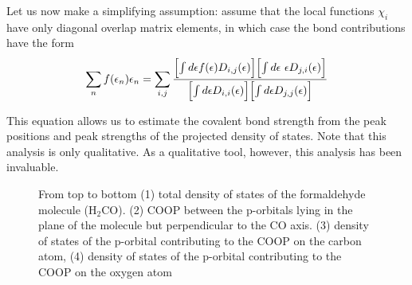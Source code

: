 \documentclass[final,12pt]{article}
\begin{document}
{Let us now make a simplifying assumption: assume that the local
functions $\chi_i$ have only diagonal overlap matrix elements, in
which case the bond contributions have the form
\begin{displaymath}
\sum_n f(\epsilon_n)\epsilon_n =
\sum_{i,j}\frac{
\Bigl[\int d\epsilon f(\epsilon) D_{i,j}(\epsilon)\Bigr]
\Bigl[\int d\epsilon\ \epsilon  D_{j,i}(\epsilon)\Bigr]
}
{
\Bigl[\int d\epsilon D_{i,i}(\epsilon)\Bigr]
\Bigl[\int d\epsilon  D_{j,j}(\epsilon)\Bigr]
}
\end{displaymath}

This equation allows us to estimate the covalent bond strength from the
peak positions and peak strengths of the projected density of states.
Note that this analysis is only qualitative. As a qualitative tool,
however, this analysis has been invaluable.


\begin{figure}
\centerline{
}
 \caption{From top to bottom (1) total density of states of the 
   formaldehyde molecule (H$_2$CO). (2) COOP between the p-orbitals
   lying in the plane of the molecule but perpendicular to the CO
   axis. (3) density of states of the p-orbital contributing to the
   COOP on the carbon atom, (4) density of states of the p-orbital
   contributing to the COOP on the oxygen atom}
\label{fig:h2copdos}
\end{figure}

}
\end{document}
